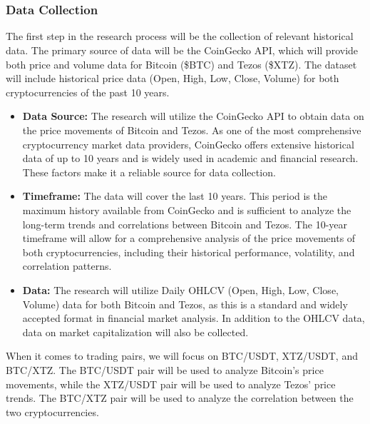 
\chapter{}%
\label{ch:methodologie}

\subsection{Data Collection}

The first step in the research process will be the collection of relevant historical data. The primary source of data will be the CoinGecko API, which will provide both price and volume data for Bitcoin (\$BTC) and Tezos (\$XTZ). The dataset will include historical price data (Open, High, Low, Close, Volume) for both cryptocurrencies of the past 10 years.

\begin{itemize}
\item \textbf{Data Source:} The research will utilize the CoinGecko API to obtain data on the price movements of Bitcoin and Tezos. As one of the most comprehensive cryptocurrency market data providers, CoinGecko offers extensive historical data of up to 10 years and is widely used in academic and financial research. These factors make it a reliable source for data collection.
  \item \textbf{Timeframe:} The data will cover the last 10 years. This period is the maximum history available from CoinGecko and is sufficient to analyze the long-term trends and correlations between Bitcoin and Tezos. The 10-year timeframe will allow for a comprehensive analysis of the price movements of both cryptocurrencies, including their historical performance, volatility, and correlation patterns.
  \item \textbf{Data:} The research will utilize Daily OHLCV (Open, High, Low, Close, Volume) data for both Bitcoin and Tezos, as this is a standard and widely accepted format in financial market analysis. In addition to the OHLCV data, data on market capitalization will also be collected.
\end{itemize}

When it comes to trading pairs, we will focus on BTC/USDT, XTZ/USDT, and BTC/XTZ. The BTC/USDT pair will be used to analyze Bitcoin's price movements, while the XTZ/USDT pair will be used to analyze Tezos' price trends. The BTC/XTZ pair will be used to analyze the correlation between the two cryptocurrencies.

